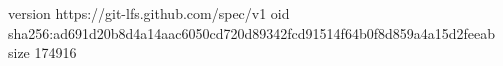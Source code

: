 version https://git-lfs.github.com/spec/v1
oid sha256:ad691d20b8d4a14aac6050cd720d89342fcd91514f64b0f8d859a4a15d2feeab
size 174916
